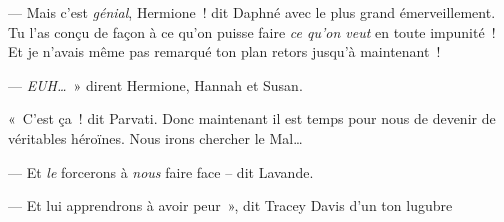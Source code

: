 --- Mais c'est \emph{génial}, Hermione~! dit Daphné avec le plus grand émerveillement.
Tu l'as conçu de façon à ce qu'on puisse faire \emph{ce qu'on veut} en toute impunité~!
Et je n'avais même pas remarqué ton plan retors jusqu'à maintenant~!

--- \emph{EUH…}~» dirent Hermione, Hannah et Susan.

«~C'est ça~! dit Parvati.
Donc maintenant il est temps pour nous de devenir de véritables héroïnes.
Nous irons chercher le Mal…

--- Et \emph{le} forcerons à \emph{nous} faire face -- dit Lavande.

--- Et lui apprendrons à avoir peur~», dit Tracey Davis d'un ton lugubre
